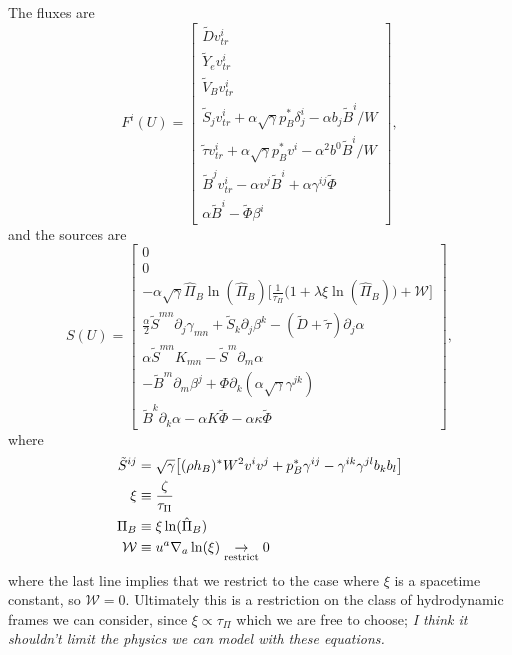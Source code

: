 \documentclass[12pt]{article}
\numberwithin{equation}{section}
\begin{document}
The fluxes are
\begin{equation}
F^i(U) =
\begin{bmatrix}
\tilde{D} v^i_{tr} \\
\tilde{Y}_e v^i_{tr} \\
\tilde{V}_B v^i_{tr} \\
\tilde{S}_j v^i_{tr} + \alpha \sqrt{\gamma} p^*_B \delta^i_j - \alpha b_j \tilde{B}^i/W \\
\tilde{\tau} v^i_{tr} + \alpha \sqrt{\gamma} p^*_B v^i - \alpha^2 b^0 \tilde{B}^i/W \\
\tilde{B}^j v^i_{tr} - \alpha v^j \tilde{B}^i + \alpha \gamma^{ij} \tilde{\Phi} \\
\alpha \tilde{B}^i - \tilde{\Phi} \beta^i
\end{bmatrix},
\end{equation}
and the sources are
\begin{equation}
S(U) =
\begin{bmatrix}
0 \\
0 \\
- \alpha \sqrt{\gamma} \hat{\Pi}_B \ln(\hat{\Pi}_B) \Big[ \frac{1}{\tau_\Pi} \Big( 1 + \lambda \xi \ln(\hat{\Pi}_B) \Big) + \mathcal{W} \Big] \\
\frac{\alpha}{2} \tilde{S}^{mn} \partial_j \gamma_{mn} + \tilde{S}_k \partial_j \beta^k - (\tilde{D} + \tilde{\tau}) \partial_j \alpha \\
\alpha \tilde{S}^{mn} K_{mn} - \tilde{S}^m \partial_m \alpha \\
-\tilde{B}^m \partial_m \beta^j + \Phi \partial_k (\alpha \sqrt{\gamma} \gamma^{jk}) \\
\tilde{B}^k \partial_k \alpha - \alpha K \tilde{\Phi} - \alpha \kappa \tilde{\Phi}
\end{bmatrix},
\end{equation}
where
\begin{equation}
\begin{aligned}
\tilde{S}^{ij} &= \sqrt{\gamma} \big[ (\rho h_B)^* W^2 v^i v^j + p^*_B \gamma^{ij} - \gamma^{ik} \gamma^{jl} b_k b_l \big] \\
\xi &\equiv \frac{\zeta}{\tau_\Pi} \\
\Pi_B &\equiv \xi \ln(\hat{\Pi}_B) \\
\mathcal{W} &\equiv u^a \nabla_a \ln (\xi) \underset{\textnormal{restrict}}{\to} 0 \\
\end{aligned}
\end{equation}
where the last line implies that we restrict to the case where $\xi$ is a spacetime constant, so $\mathcal{W} = 0$.
Ultimately this is a restriction on the class of hydrodynamic frames we can consider, since $\xi \propto \tau_{\Pi}$ which we are free to choose; \textit{I think it shouldn't limit the physics we can model with these equations.}
\end{document}

